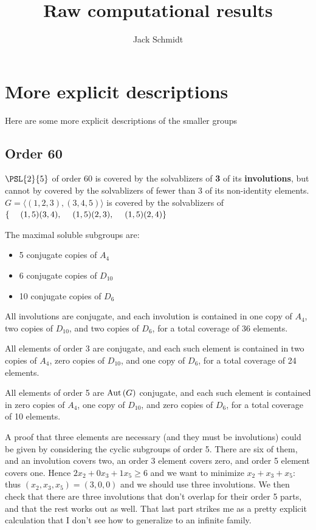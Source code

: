 \documentclass[12pt]{amsart}
\title{Raw computational results}
\author{Jack Schmidt}
\begin{document}


\clearpage

\section{More explicit descriptions}

Here are some more explicit descriptions of the smaller groups

\subsection{Order 60}

$\PSL{2}{5}$ of order $60$ is covered by the solvablizers of \textbf{3} of its
\textbf{involutions}, but cannot by covered by the solvablizers of fewer
than $3$ of its non-identity elements. \\
{\tiny $G = \langle (1,2,3), (3,4,5) \rangle$ is covered by the solvablizers
of $\{ \\
\phantom. \quad (1,5)(3,4), \\
\phantom. \quad (1,5)(2,3), \\
\phantom. \quad (1,5)(2,4) \\
\}$}

The maximal soluble subgroups are:
\begin{itemize}
\item 5 conjugate copies of $A_4$
\item 6 conjugate copies of $D_{10}$
\item 10 conjugate copies of $D_{6}$
\end{itemize}

All involutions are conjugate, and each involution is contained in one
copy of $A_4$, two copies of $D_{10}$, and two copies of $D_{6}$, for
a total coverage of 36 elements.

All elements of order 3 are conjugate, and each such element is contained
in two copies of $A_4$, zero copies of $D_{10}$, and one copy of $D_{6}$,
for a total coverage of 24 elements.

All elements of order 5 are $\operatorname{Aut}\left(G\right)$ conjugate, and each such element is
contained in zero copies of $A_4$, one copy of $D_{10}$, and zero copies
of $D_{6}$, for a total coverage of 10 elements.

A proof that three elements are necessary (and they must be involutions)
could be given by considering the cyclic subgroups of order 5. There are
six of them, and an involution covers two, an order 3 element covers zero,
and order 5 element covers one. Hence $2x_2 + 0x_3 + 1x_5 \geq 6$ and we
want to minimize $x_2+x_3+x_5$: thus $(x_2,x_3,x_5)=(3,0,0)$ and we should
use three involutions. We then check that there are three involutions that
don't overlap for their order 5 parts, and that the rest works out as well.
That last part strikes me as a pretty explicit calculation that I don't
see how to generalize to an infinite family.
\end{document}
